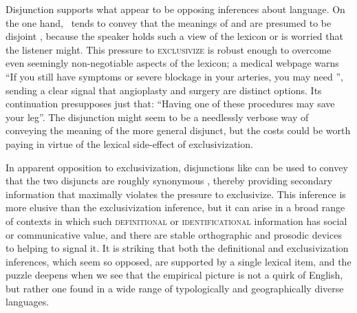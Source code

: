 \documentclass[12pt,twoside]{article}
\renewcommand{\_}{\textbf{\textunderscore\hspace{-4pt}\textunderscore\hspace{-3pt}\textunderscore\hspace{-4pt}\textunderscore}\hspace{0.5pt}}			%
\newcommand{\technicalTerm}[1]{\textsc{#1}}
\begin{document}
Disjunction supports what appear to be opposing inferences about
language. On the one hand, \XorY\ tends to convey that the meanings of
 and  are presumed to be disjoint
\citep{Hurford:1974}, because the speaker holds such a view of the
lexicon or is worried that the listener might. This pressure to
\technicalTerm{exclusivize} is robust enough to overcome even
seemingly non-negotiable aspects of the lexicon; a medical webpage
warns ``If you still have symptoms or severe blockage in your
arteries, you may need '', sending a
clear signal that angioplasty and surgery are distinct options. Its
continuation presupposes just that: ``Having one of these procedures
may save your leg''. The disjunction might seem to be a needlessly
verbose way of conveying the meaning of the more general disjunct, but
the costs could be worth paying in virtue of the lexical side-effect
of exclusivization.

In apparent opposition to exclusivization, disjunctions like
 can be used to convey that the two
disjuncts are roughly synonymous \citep{Horn89}, thereby providing
secondary information that maximally violates the pressure to
exclusivize. This inference is more elusive than the exclusivization
inference, but it can arise in a broad range of contexts in which such
\technicalTerm{definitional} or \technicalTerm{identificational}
information has social or communicative value, and there are stable
orthographic and prosodic devices to helping to signal it. It is
striking that both the definitional and exclusivization inferences,
which seem so opposed, are supported by a single lexical item, and the
puzzle deepens when we see that the empirical picture is not a quirk
of English, but rather one found in a wide range of typologically and
geographically diverse languages.
\end{document}
